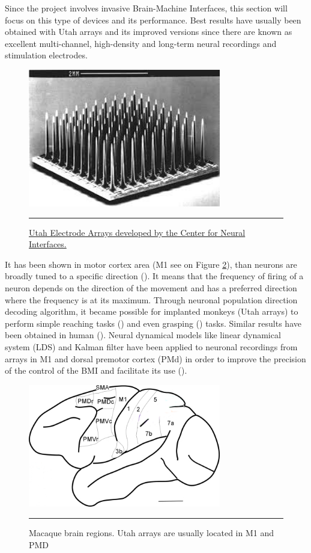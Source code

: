 \documentclass[preprint,12pt]{elsarticle}
\begin{document}
Since the project involves invasive Brain-Machine Interfaces, this section will focus on this type of devices and its performance. Best results have usually been obtained with Utah arrays  and its improved versions since there are known as excellent multi-channel, high-density and long-term neural recordings and stimulation electrodes.
\begin{figure}[htbp]
\centering
\includegraphics[width=0.75\textwidth]{images/utaharray.jpeg}
\rule{35em}{0.5pt}
\caption[A Utah Array]{\href{http://www.sci.utah.edu/~gk/abstracts/bisti03}{Utah Electrode Arrays developed by the Center for Neural Interfaces.}}
\label{fig:utaharray}
\end{figure}
It has been shown in motor cortex area (M1 see on Figure \ref{fig:monkeybrainarea}),  than neurons are broadly tuned to a specific direction (\citet{Georgopoulos1986}). It means that the frequency of firing of a neuron depends on the direction of the movement and has a preferred direction where the frequency is at its maximum. Through neuronal population direction decoding algorithm, it became possible for implanted monkeys (Utah arrays) to perform simple reaching tasks (\citet{Chapin1999}) and even grasping (\citet{Carmena2003}) tasks. Similar results have been obtained in human (\citet{Hochberg2006}). Neural dynamical models like linear dynamical system (LDS) and Kalman filter have been applied to neuronal recordings from arrays in M1 and dorsal premotor cortex (PMd)  in order to improve the precision of the control of the BMI and facilitate its use (\citet{Kao2015}).
\begin{figure}[htbp]
\centering
\includegraphics[width=0.75\textwidth]{images/monkeybrain.png}
\rule{35em}{0.5pt}
\caption[A monkey brain scheme]{Macaque brain regions. Utah arrays are usually located in M1 and PMD}
\label{fig:monkeybrainarea}
\end{figure}
\end{document}
